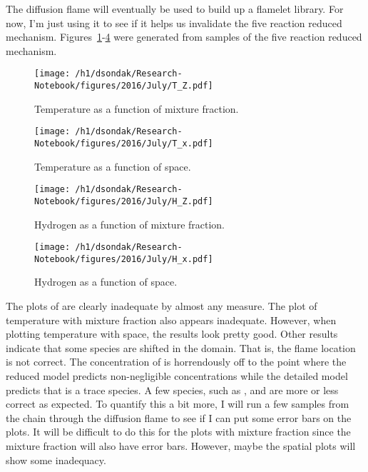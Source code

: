 The diffusion flame will eventually be used to build up a flamelet library.  For now, I'm just using it to
see if it helps us invalidate the five reaction reduced mechanism.  Figures~\ref{fig:T_Z}-\ref{fig:H2_x} were generated
from samples of the five reaction reduced mechanism.
\begin{figure}[h!]
  \centering
  \texttt{[image: /h1/dsondak/Research-Notebook/figures/2016/July/T\_Z.pdf]}
  \caption{Temperature as a function of mixture fraction.}
  \label{fig:T_Z}
\end{figure}
\begin{figure}[h!]
  \centering
  \texttt{[image: /h1/dsondak/Research-Notebook/figures/2016/July/T\_x.pdf]}
  \caption{Temperature as a function of space.}
  \label{fig:T_x}
\end{figure}
\begin{figure}[h!]
  \centering
  \texttt{[image: /h1/dsondak/Research-Notebook/figures/2016/July/H\_Z.pdf]}
  \caption{Hydrogen as a function of mixture fraction.}
  \label{fig:H2_Z}
\end{figure}
\begin{figure}[h!]
  \centering
  \texttt{[image: /h1/dsondak/Research-Notebook/figures/2016/July/H\_x.pdf]}
  \caption{Hydrogen as a function of space.}
  \label{fig:H2_x}
\end{figure}
The plots of  are clearly inadequate by almost any measure.  The plot of temperature with
mixture fraction also appears inadequate.  However, when plotting temperature with space, the results
look pretty good.  Other results indicate that some species are shifted in the domain.  That is, 
the flame location is not correct.  The concentration of  is horrendously off to the point
where the reduced model predicts non-negligible concentrations while the detailed model predicts 
that  is a trace species.  A few species, such as ,  and  are more
or less correct as expected.  To quantify this a bit more, I will run a few samples from the chain
through the diffusion flame to see if I can put some error bars on the plots.  It will be difficult
to do this for the plots with mixture fraction since the mixture fraction will also have error bars.
However, maybe the spatial plots will show some inadequacy.




